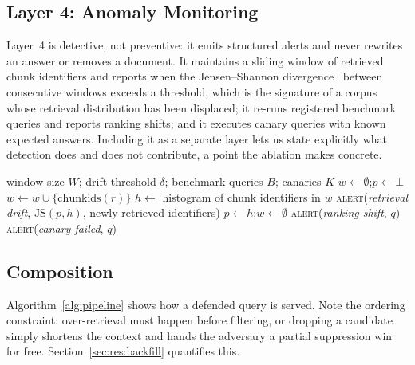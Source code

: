 \documentclass[information,article,submit,moreauthors]{Definitions/mdpi}
\begin{document}
\subsection{Layer 4: Anomaly Monitoring}
\label{sec:l4}

Layer~4 is detective, not preventive: it emits structured alerts and never rewrites an answer
or removes a document. It maintains a sliding window of retrieved chunk identifiers and reports
when the Jensen--Shannon divergence~\citep{lin1991divergence} between consecutive windows
exceeds a threshold, which is the signature of a corpus whose retrieval distribution has been
displaced; it re-runs registered benchmark queries and reports ranking shifts; and it executes
canary queries with known expected answers. Including it as a separate layer lets us state
explicitly what detection does and does not contribute, a point the ablation makes concrete.

\begin{algorithm}[H]
\caption{Layer 4: retrieval-drift monitoring}
\label{alg:l4}
\begin{algorithmic}[1]
\Require window size $W$; drift threshold $\delta$; benchmark queries $B$; canaries $K$
\State $w \gets \emptyset$;\quad $p \gets \bot$ 
  \State $w \gets w \cup \{\mathrm{chunkids}(r)\}$
     \State $h \gets$ histogram of chunk identifiers in $w$
        \State \textsc{alert}(\emph{retrieval drift}, $\mathrm{JS}(p,h)$, newly retrieved identifiers)
     \EndIf
     \State $p \gets h$;\quad $w \gets \emptyset$
  \EndIf
\EndFor
{} 
     \State \textsc{alert}(\emph{ranking shift}, $q$)
  \EndIf
\EndFor
{}
   \State \textsc{alert}(\emph{canary failed}, $q$) \EndIf
\EndFor
\end{algorithmic}
\end{algorithm}

\subsection{Composition}

Algorithm~\ref{alg:pipeline} shows how a defended query is served. Note the ordering
constraint: over-retrieval must happen before filtering, or dropping a candidate simply
shortens the context and hands the adversary a partial suppression win for free.
Section~\ref{sec:res:backfill} quantifies this.
\end{document}
